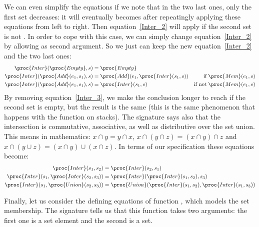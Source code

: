    We can even simplify the equations if we note that in the two last
   ones, only the first set decreases: it will eventually becomes
    after repeatingly applying these equations from left
   to right. Then equation~\ref{Inter_2} will apply if the second set
   is not . In order to cope with this case, we can simply
   change equation~\ref{Inter_2} by allowing  as second
   argument. So we just can keep the new equation~\ref{Inter_2} and
   the two last ones:
   \begin{align*}
      \proc{Inter} (\proc{Empty}, s)
   &= \proc{Empty}\\
      \proc{Inter} (\proc{Add} (e_1, s_1), s)
   &= \proc{Add} (e_1, \proc{Inter} (s_1, s))
   & \text{if} \; \proc{Mem} (e_1, s)\\
      \proc{Inter} (\proc{Add} (e_1, s_1), s)
   &= \proc{Inter} (s_1, s)
   & \text{if not} \; \proc{Mem} (e_1, s)
   \end{align*}
   By removing equation~\ref{Inter_3}, we make the conclusion longer
   to reach if the second set is empty, but the result is the same
   (this is the same phenomenon that happens with the 
   function on stacks). The signature says also that the intersection
   is commutative, associative, as well as distributive over the set
   union. This means in mathematics: \(x \cap y = y \cap x\), \(x \cap
   (y \cap z) = (x \cap y) \cap z\) and \(x \cap (y \cup z) = (x \cap
   y) \cup (x \cap z)\). In terms of our specification these equations
   become:
   \begin{align}
        \proc{Inter} (s_1, s_2)
     &= \proc{Inter} (s_2, s_1)\\
        \proc{Inter} (s_1, \proc{Inter} (s_2, s_3))
     &= \proc{Inter} (\proc{Inter} (s_1, s_2), s_3)\\
        \proc{Inter} (s_1, \proc{Union} (s_2, s_3))
     &= \proc{Union} (\proc{Inter} (s_1, s_2), \proc{Inter}
        (s_1, s_3))
   \end{align}

   Finally, let us consider the defining equations of function
   , which models the set membership. The signature tells us
   that this function takes two arguments: the first one is a set
   element and the second is a set. 
 
